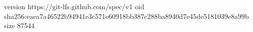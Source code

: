 version https://git-lfs.github.com/spec/v1
oid sha256:eaea7a46522b94941e3c571e60918bb387c288ba8940d7e45de5181039e8a99b
size 87544
